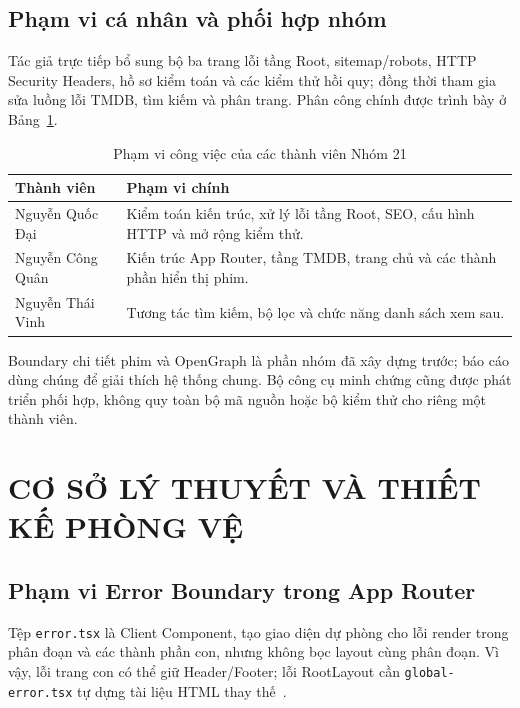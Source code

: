 \documentclass[12pt,a4paper]{extarticle}
\begin{document}
\subsection{Phạm vi cá nhân và phối hợp nhóm}
Tác giả trực tiếp bổ sung bộ ba trang lỗi tầng Root, sitemap/robots, HTTP Security Headers, hồ sơ kiểm toán và các kiểm thử hồi quy; đồng thời tham gia sửa luồng lỗi TMDB, tìm kiếm và phân trang. Phân công chính được trình bày ở Bảng~\ref{tab:roles}.
\begin{table}[H]
\centering
\caption{Phạm vi công việc của các thành viên Nhóm 21}
\label{tab:roles}
\fontsize{10}{13}\selectfont
\renewcommand{\arraystretch}{1.15}
\begin{tabularx}{\textwidth}{|p{3.1cm}|X|}
\hline
\textbf{Thành viên} & \textbf{Phạm vi chính} \\
\hline
Nguyễn Quốc Đại & Kiểm toán kiến trúc, xử lý lỗi tầng Root, SEO, cấu hình HTTP và mở rộng kiểm thử. \\
\hline
Nguyễn Công Quân & Kiến trúc App Router, tầng TMDB, trang chủ và các thành phần hiển thị phim. \\
\hline
Nguyễn Thái Vinh & Tương tác tìm kiếm, bộ lọc và chức năng danh sách xem sau. \\
\hline
\end{tabularx}
\end{table}
Boundary chi tiết phim và OpenGraph là phần nhóm đã xây dựng trước; báo cáo dùng chúng để giải thích hệ thống chung. Bộ công cụ minh chứng cũng được phát triển phối hợp, không quy toàn bộ mã nguồn hoặc bộ kiểm thử cho riêng một thành viên.

\clearpage
\section{CƠ SỞ LÝ THUYẾT VÀ THIẾT KẾ PHÒNG VỆ}
\subsection{Phạm vi Error Boundary trong App Router}
Tệp \texttt{error.tsx} là Client Component, tạo giao diện dự phòng cho lỗi render trong phân đoạn và các thành phần con, nhưng không bọc layout cùng phân đoạn. Vì vậy, lỗi trang con có thể giữ Header/Footer; lỗi RootLayout cần \texttt{global-error.tsx} tự dựng tài liệu HTML thay thế~\cite{nextjs-error}.
\end{document}
